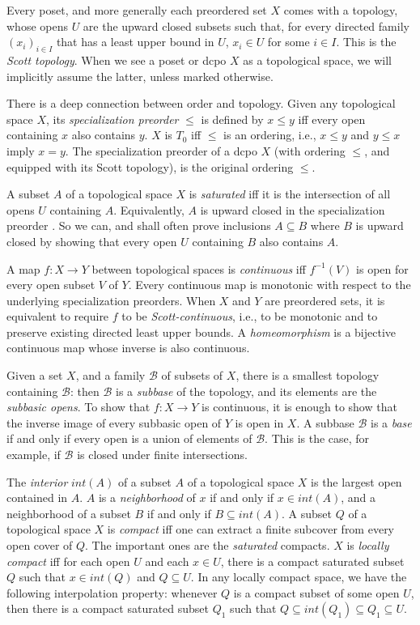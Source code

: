 \documentclass{LMCS}
\newcommand{\interior}[1]{int ({#1})} \newcommand{\biginterior}[1]{\interior{#1}}
\begin{document}
Every poset, and more generally each preordered set $X$ comes with a
topology, whose opens $U$ are the upward closed subsets such that, for
every directed family ${(x_i)}_{i \in I}$ that has a least upper bound
in $U$, $x_i \in U$ for some $i \in I$.  This is the {\em Scott
  topology\/}.  When we see a poset or dcpo $X$ as a topological
space, we will implicitly assume the latter, unless marked otherwise.

There is a deep connection between order and topology.  Given any topological space $X$, its {\em specialization preorder\/}
$\leq$ is defined by $x \leq y$ iff every open containing $x$ also
contains $y$.  $X$ is $T_0$ iff $\leq$ is an ordering, i.e., $x \leq
y$ and $y \leq x$ imply $x=y$.  The specialization preorder of a
dcpo $X$ (with ordering $\leq$, and equipped with its Scott topology),
is the original ordering $\leq$.

A subset $A$ of a topological space $X$ is {\em saturated\/} iff it is
the intersection of all opens $U$ containing $A$.  Equivalently, $A$
is upward closed in the specialization preorder \cite[Remark
after Definition~4.34]{Mislove:topo:CS}.  So we can, and shall often
prove inclusions $A \subseteq B$ where $B$ is upward closed by showing
that every open $U$ containing $B$ also contains $A$.

A map $f : X \to Y$ between topological spaces is {\em continuous\/}
iff $f^{-1} (V)$ is open for every open subset $V$ of $Y$.  Every
continuous map is monotonic with respect to the underlying
specialization preorders.  When $X$ and $Y$ are preordered sets, it is
equivalent to require $f$ to be {\em Scott-continuous\/}, i.e., to be
monotonic and to preserve existing directed least upper bounds.  A
{\em homeomorphism\/} is a bijective continuous map whose inverse is
also continuous.

Given a set $X$, and a family $\mathcal B$ of subsets of $X$, there is
a smallest topology containing $\mathcal B$: then $\mathcal B$ is a
{\em subbase\/} of the topology, and its elements are the {\em
  subbasic opens\/}.  To show that $f : X \to Y$ is continuous, it is
enough to show that the inverse image of every subbasic open of $Y$ is
open in $X$.  A subbase $\mathcal B$ is a \emph{base} if and only if
every open is a union of elements of $\mathcal B$.  This is the case,
for example, if $\mathcal B$ is closed under finite intersections.

The {\em interior\/} $\interior A$ of a subset $A$ of a topological
space $X$ is the largest open contained in $A$.  $A$ is a
\emph{neighborhood} of $x$ if and only if $x \in \interior A$, and a
neighborhood of a subset $B$ if and only if $B \subseteq \interior A$.
A subset $Q$ of a topological space $X$ is {\em compact\/} iff one can
extract a finite subcover from every open cover of $Q$.  The important
ones are the {\em saturated\/} compacts.
$X$ is {\em locally compact\/} iff for each open $U$ and each $x \in
U$, there is a compact saturated subset $Q$ such that $x \in \interior
Q$ and $Q \subseteq U$.  In any locally compact space, we have the
following interpolation property: whenever $Q$ is a compact subset of
some open $U$, then there is a compact saturated subset $Q_1$ such
that $Q \subseteq \interior {Q_1} \subseteq Q_1 \subseteq U$.
\end{document}
